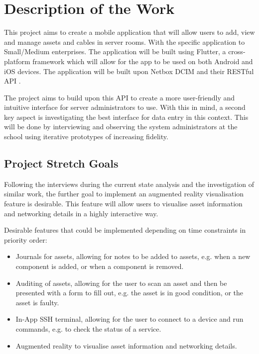 \documentclass [11pt,a4paper]{article}
\begin{document}
\section{Description of the Work}
\label{sec:work}
This project aims to create a mobile application that will allow users to add, view and manage assets and cables in server rooms. With the specific application to Small/Medium enterprises. The application will be built using Flutter, a cross-platform framework which will allow for the app to be used on both Android and iOS devices. The application will be built upon Netbox DCIM \cite{Netbox} and their RESTful API \cite{NetboxAPI}. 

The project aims to build upon this API to create a more user-friendly and intuitive interface for server administrators to use. With this in mind, a second key aspect is investigating the best interface for data entry in this context. This will be done by interviewing and observing the system administrators at the school using iterative prototypes of increasing fidelity.

\subsection{Project Stretch Goals}
\label{sec:stretchgoals}
Following the interviews during the current state analysis and the investigation of similar work, the further goal to implement an augmented reality visualisation feature is desirable. This feature will allow users to visualise asset information and networking details in a highly interactive way. 

Desirable features that could be implemented depending on time constraints in priority order: 
\begin{itemize}
\item Journals for assets, allowing for notes to be added to assets, e.g. when a new component is added, or when a component is removed.

\item Auditing of assets, allowing for the user to scan an asset and then be presented with a form to fill out, e.g. the asset is in good condition, or the asset is faulty. 

\item In-App SSH terminal, allowing for the user to connect to a device and run commands, e.g. to check the status of a service.

\item Augmented reality to visualise asset information and networking details.
\end{itemize}
\end{document}
